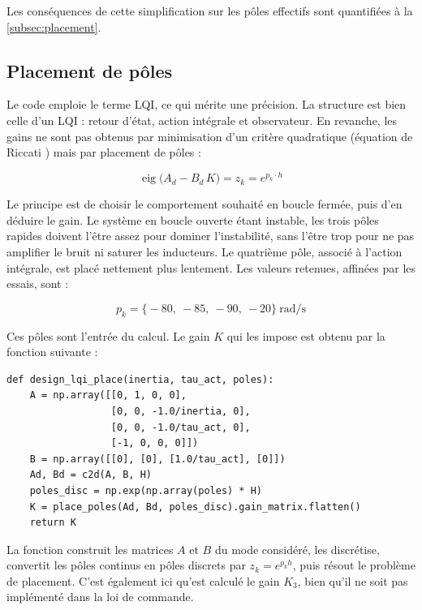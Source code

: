 Les conséquences de cette simplification sur les pôles effectifs sont quantifiées à la \autoref{subsec:placement}.

\subsection{Placement de pôles}
\label{subsec:placement}

Le code emploie le terme LQI, ce qui mérite une précision. La structure est bien celle d'un LQI : retour d'état, action intégrale et observateur. En revanche, les gains ne sont pas obtenus par minimisation d'un critère quadratique (équation de Riccati \cite{Riccati}) mais par placement de pôles :

\begin{equation}
    \operatorname{eig}\bigl(A_d - B_d\,K\bigr) = z_k = e^{p_k \cdot h}
    \label{eq:placement}
\end{equation}

Le principe est de choisir le comportement souhaité en boucle fermée, puis d'en déduire le gain. Le système en boucle ouverte étant instable, les trois pôles rapides doivent l'être assez pour dominer l'instabilité, sans l'être trop pour ne pas amplifier le bruit ni saturer les inducteurs. Le quatrième pôle, associé à l'action intégrale, est placé nettement plus lentement. Les valeurs retenues, affinées par les essais, sont :

\begin{equation}
    p_k = \bigl\{-80,\ -85,\ -90,\ -20\bigr\}\ \mathrm{rad/s}
\end{equation}

Ces pôles sont l'entrée du calcul. Le gain $K$ qui les impose est obtenu par la fonction suivante :

\begin{verbatim}
def design_lqi_place(inertia, tau_act, poles):
    A = np.array([[0, 1, 0, 0],
                  [0, 0, -1.0/inertia, 0],
                  [0, 0, -1.0/tau_act, 0],
                  [-1, 0, 0, 0]])
    B = np.array([[0], [0], [1.0/tau_act], [0]])
    Ad, Bd = c2d(A, B, H)
    poles_disc = np.exp(np.array(poles) * H)
    K = place_poles(Ad, Bd, poles_disc).gain_matrix.flatten()
    return K
\end{verbatim}

La fonction construit les matrices $A$ et $B$ du mode considéré, les discrétise, convertit les pôles continus en pôles discrets par $z_k = e^{p_k h}$, puis résout le problème de placement. C'est également ici qu'est calculé le gain $K_3$, bien qu'il ne soit pas implémenté dans la
loi de commande.

